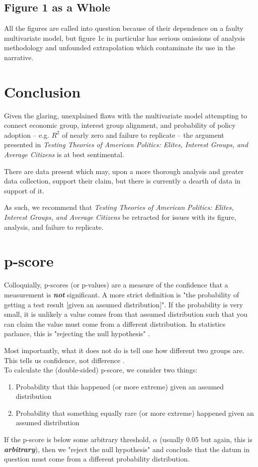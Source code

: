 \documentclass[]{article}
\begin{document}
\subsection{Figure 1 as a Whole}
All the figures are called into question because of their dependence on a faulty multivariate model, but figure 1c in particular has serious omissions of analysis methodology and unfounded extrapolation which contaminate its use in the narrative.


\section{Conclusion}
Given the glaring, unexplained flaws with the multivariate model attempting to connect economic group, interest group alignment, and probability of policy adoption -- e.g. $R^2$ of nearly zero and failure to replicate -- the argument presented in \textit{Testing Theories of American Politics: Elites, Interest Groups, and Average Citizens} is at best sentimental.

There are data present which may, upon a more thorough analysis and greater data collection, support their claim, but there is currently a dearth of data in support of it.

As such, we recommend that \textit{Testing Theories of American Politics: Elites, Interest Groups, and Average Citizens} be retracted for issues with its figure, analysis, and failure to replicate.

\newpage


\newpage
\appendix
\section{p-score}
\label{section_p-score}
Colloquially, p-scores (or p-values) are a measure of the confidence that a measurement is \textbf{\textit{not}} significant. 
A more strict definition is "the probability of getting a test result [given an assumed distribution]". 
If the probability is very small, it is unlikely a value comes from that assumed distribution such that you can claim the value must come from a different distribution.
In statistics parlance, this is "rejecting the null hypothesis" \cite{introstats, statquest_1, statquest_2}.

Most importantly, what it does not do is tell one how different two groups are. This tells us confidence, not difference \cite{statquest_1, statquest_2}.\\

To calculate the (double-sided) p-score, we consider two things:
\begin{enumerate}
	\item Probability that this happened (or more extreme) given an assumed distribution
	\item Probability that something equally rare (or more extreme) happened given an assumed distribution
\end{enumerate}
If the p-score is below some arbitrary threshold, $\alpha$ (usually 0.05 but again, this is \textbf{\textit{arbitrary}}), then we "reject the null hypothesis" and conclude that the datum in question must come from a different probability distribution.
\end{document}
